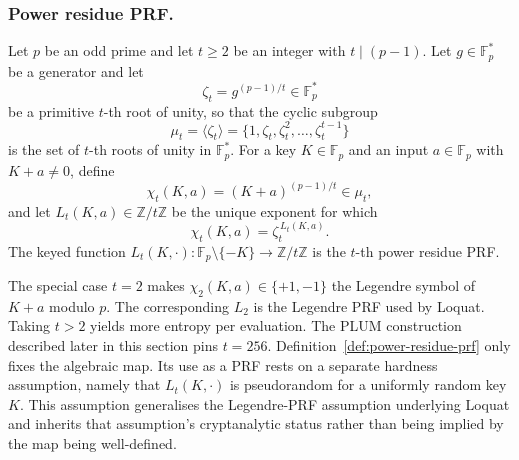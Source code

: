 \subsubsection{Power residue PRF.}
\begin{definition}\label{def:power-residue-prf}
Let \(p\) be an odd prime and let \(t\ge 2\) be an integer with \(t \mid (p-1)\). Let \(g \in \mathbb{F}_p^\ast\) be a generator and let
\begin{equation*}
  \zeta_t = g^{(p-1)/t} \in \mathbb{F}_p^\ast
\end{equation*}
be a primitive \(t\)-th root of unity, so that the cyclic subgroup
\begin{equation*}
  \mu_t = \langle \zeta_t \rangle = \{1,\zeta_t,\zeta_t^2,\ldots,\zeta_t^{t-1}\}
\end{equation*}
is the set of \(t\)-th roots of unity in \(\mathbb{F}_p^\ast\). For a key \(K\in\mathbb{F}_p\) and an input \(a\in\mathbb{F}_p\) with \(K+a\ne 0\), define
\begin{equation*}
  \chi_t(K,a) = (K+a)^{(p-1)/t} \in \mu_t,
\end{equation*}
and let \(L_t(K,a)\in\mathbb{Z}/t\mathbb{Z}\) be the unique exponent for which
\begin{equation*}
  \chi_t(K,a) = \zeta_t^{\,L_t(K,a)}.
\end{equation*}
The keyed function \(L_t(K,\cdot):\mathbb{F}_p\setminus\{-K\}\to\mathbb{Z}/t\mathbb{Z}\) is the \(t\)-th power residue PRF.
\end{definition}

The special case \(t=2\) makes \(\chi_2(K,a)\in\{+1,-1\}\) the Legendre symbol of \(K+a\) modulo \(p\). The corresponding \(L_2\) is the Legendre PRF used by Loquat. Taking \(t>2\) yields more entropy per evaluation. The PLUM construction described later in this section pins \(t=256\). Definition~\ref{def:power-residue-prf} only fixes the algebraic map. Its use as a PRF rests on a separate hardness assumption, namely that \(L_t(K,\cdot)\) is pseudorandom for a uniformly random key \(K\). This assumption generalises the Legendre-PRF assumption underlying Loquat and inherits that assumption's cryptanalytic status rather than being implied by the map being well-defined.


